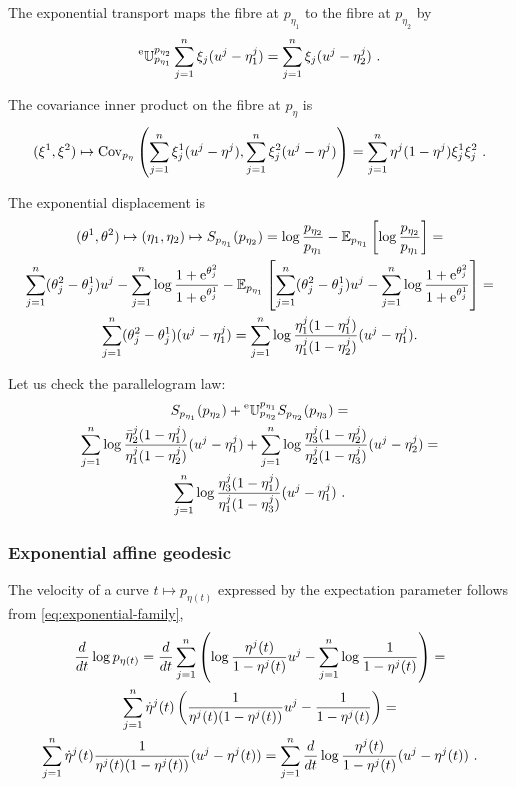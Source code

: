 \documentclass[12pt,a4paper]{amsart}
\begin{document}
The exponential transport maps the fibre at $p_{\eta_1}$ to the fibre at $p_{\eta_2}$ by
\begin{equation}
  \label{eq:49}
  \prescript{\text{e}}{} {\mathbb U} _ {p_{\eta_1}} ^ {p_{\eta_2}} \sum_{j=1}^n \xi_j(u^j - \eta^j_1) = \sum_{j=1}^n \xi_j(u^j - \eta^j_2) \ .
\end{equation}

The covariance inner product on the fibre at $p_\eta$ is
\begin{equation}
  \label{eq:29}
(\xi^1,\xi^2) \mapsto  \operatorname{Cov}_{p_\eta}\left(\sum_{j=1}^n \xi_j^1 (u^j - \eta^j),\sum_{j=1}^n  \xi_j^2(u^j-\eta^j)\right) = \sum_{j=1}^n \eta^j(1-\eta^j) \xi_j^1 \xi_j^2 \ .
\end{equation}

The exponential displacement is
\begin{multline}
  \label{eq:30}
  (\theta^1,\theta^2) \mapsto (\eta_1,\eta_2) \mapsto
  S_{p_{\eta_1}}(p_{\eta_2}) = \log \frac {p_{\eta_2}}{p_{\eta_1}} - \operatorname{\mathbb E}_{p_{\eta_1}}\left[\log \frac {p_{\eta_2}}{p_{\eta_1}}\right] = \\
  \sum_{j=1}^n (\theta^2_j - \theta_j^1) u^j - \sum_{j=1}^n \log \frac {1 + \mathrm{e}^{\theta_j^2}}{1 + \mathrm{e}^{\theta_j^1}} - \operatorname{\mathbb E}_{p_{\eta_1}}\left[ \sum_{j=1}^n (\theta_j^2 - \theta_j^1) u^j - \sum_{j=1}^n \log \frac {1 + \mathrm{e}^{\theta_j^2}}{1 + \mathrm{e}^{\theta_j^1}}\right] = \\
  \sum_{j=1}^n (\theta_j^2 - \theta_j^1)(u^j - \eta^j_1) = \sum_{j=1}^n \log \frac {\eta^j_1(1 - \eta^j_1)}{\eta^j_1 (1-\eta^j_2)} (u^j - \eta^j_1) .
\end{multline}

Let us check the parallelogram law:
\begin{multline}
  \label{eq:31}
  S_{p_{\eta_1}}(p_{\eta_2}) + \prescript{\text{e}}{} {\mathbb U} _ {p_{\eta_2}} ^ {p_{\eta_1}} S_{p_{\eta_2}}(p_{\eta_3}) = \\ 
  \sum_{j=1}^n \log \frac {\bar \eta^j_2(1 - \eta^j_1)}{\eta^j_1 (1- \eta^j_2)} (u^j - \eta^j_1) + \sum_{j=1}^n \log \frac {\eta_3^j(1 - \eta_2^j)}{\eta^j_2 (1- \eta_3^j)} (u^j - \eta^j_2) = \\
  \sum_{j=1}^n \log \frac {\eta^j_3(1 - \eta^j_1)}{\eta^j_1 (1- \eta_3^j)} (u^j - \eta^j_1) \ .
\end{multline}

\subsubsection{Exponential affine geodesic}
\label{sec:expon-affine-geod}
The velocity of a curve $t \mapsto p_{\eta(t)}$ expressed by the expectation parameter follows from \cref{eq:exponential-family},
\begin{multline}
  \label{eq:32}
 \frac{d}{dt} \log p_{\eta(t)} =  \frac{d}{dt} \sum_{j=1}^n \left(\log \frac{\eta^j(t)}{1-\eta^j(t)} u^j - \sum_{j=1}^n \log \frac 1 {1 - \eta^j(t)}\right) = \\
  \sum_{j=1}^n \dot \eta^j(t) \left(\frac 1 {\eta^j(t)(1 - \eta^j(t))}u^j - \frac 1 {1 - \eta^j(t)}\right) = \\
    \sum_{j=1}^n \dot \eta^j(t) \frac{1}{\eta^j(t)(1 - \eta^j(t))} (u^j - \eta^j(t)) = \sum_{j=1}^n \frac{d}{dt} \log \frac {\eta^j(t)}{1 - \eta^j(t)} (u^j - \eta^j(t)) \ .
\end{multline}
\end{document}
